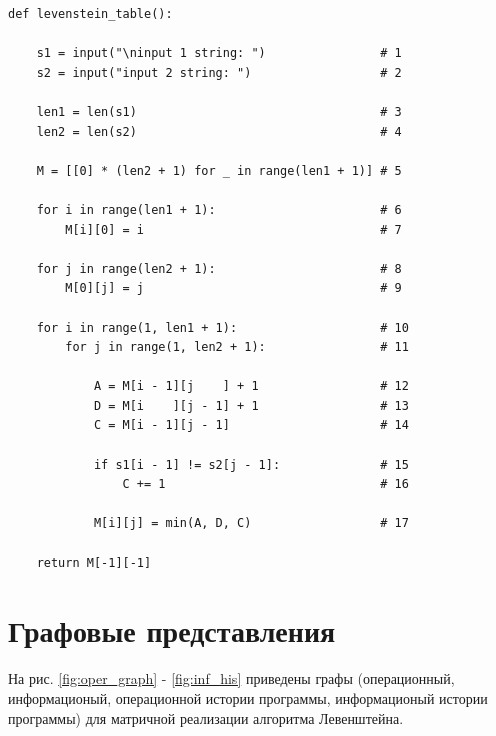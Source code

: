 \documentclass[a4paper,14pt, unknownkeysallowed]{extreport}
\begin{document}
\begin{center}
\captionsetup{justification=raggedright,singlelinecheck=off}
\begin{lstlisting}[label=lst:classical_alg,caption=Функция нахождения расстояния Левенштейна итеративно]
def levenstein_table():

    s1 = input("\ninput 1 string: ")       			# 1
    s2 = input("input 2 string: ")           		# 2

    len1 = len(s1)                                  # 3
    len2 = len(s2)                                  # 4

    M = [[0] * (len2 + 1) for _ in range(len1 + 1)] # 5

    for i in range(len1 + 1):                       # 6    
        M[i][0] = i                                 # 7
    
    for j in range(len2 + 1):                       # 8   
        M[0][j] = j                                 # 9   

    for i in range(1, len1 + 1):                    # 10   
        for j in range(1, len2 + 1):                # 11
                              
            A = M[i - 1][j    ] + 1                 # 12
            D = M[i    ][j - 1] + 1                 # 13
            C = M[i - 1][j - 1]                     # 14
            
            if s1[i - 1] != s2[j - 1]:              # 15
                C += 1                              # 16

            M[i][j] = min(A, D, C)                  # 17

    return M[-1][-1]
\end{lstlisting}
\end{center}

\clearpage

\chapter{Графовые представления}

На рис. \ref{fig:oper_graph} - \ref{fig:inf_his} приведены графы (операционный, информационый, операционной истории программы, информационый истории программы) для матричной реализации алгоритма Левенштейна.
\end{document}
